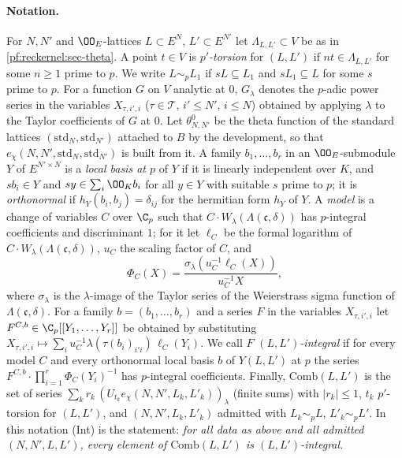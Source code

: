 \paragraph{Notation.} For $N,N'$ and $\OO_E$-lattices $L\subset E^N$, $L'\subset E^{N'}$ let $\Lambda_{L,L'}\subset V$ be as in
\cref{pf:reckernel:sec-theta}. A point $t\in V$ is \emph{$p'$-torsion} for $(L,L')$ if $nt\in\Lambda_{L,L'}$ for some
$n\ge1$ prime to $p$. We write $L\sim_pL_1$ if $sL\subseteq L_1$ and $sL_1\subseteq L$ for some $s$ prime to $p$. For a
function $G$ on $V$ analytic at $0$, $G_\lambda$ denotes the $p$-adic power series in the variables $X_{\tau,i',i}$
($\tau\in\mathcal T$, $i'\le N'$, $i\le N$) obtained by applying $\lambda$ to the Taylor coefficients of $G$ at $0$. Let
$\theta^0_{N,N'}$ be the theta function of the standard lattices $(\mathrm{std}_N,\mathrm{std}_{N'})$ attached to $B$ by the
development, so that $e_\chi(N,N',\mathrm{std}_N,\mathrm{std}_{N'})$ is built from it. A family $b_1,\dots,b_r$ in an
$\OO_E$-submodule $Y$ of $E^{N'\times N}$ is a \emph{local basis at $p$} of $Y$ if it is linearly independent over $K$, and
$sb_i\in Y$ and $sy\in\sum_i\OO_Kb_i$ for all $y\in Y$ with suitable $s$ prime to $p$; it is \emph{orthonormal} if
$h_Y(b_i,b_j)=\delta_{ij}$ for the hermitian form $h_Y$ of $Y$. A \emph{model} is a change of variables $C$ over $\C_p$ such
that $C\cdot W_\lambda(\Lambda(\mathfrak c,\delta))$ has $p$-integral coefficients and discriminant $1$; for it let $\ell_C$
be the formal logarithm of $C\cdot W_\lambda(\Lambda(\mathfrak c,\delta))$, $u_C$ the scaling factor of $C$, and
\[
\Phi_C(X)=\frac{\sigma_\lambda(u_C^{-1}\ell_C(X))}{u_C^{-1}X},
\]
where $\sigma_\lambda$ is the $\lambda$-image of the Taylor series of the Weierstrass sigma function of
$\Lambda(\mathfrak c,\delta)$. For a family $b=(b_1,\dots,b_r)$ and a series $F$ in the variables $X_{\tau,i',i}$ let
$F^{C,b}\in\C_p[[Y_1,\dots,Y_r]]$ be obtained by substituting
$X_{\tau,i',i}\mapsto\sum_iu_C^{-1}\lambda(\tau(b_i)_{i'i})\,\ell_C(Y_i)$. We call $F$ \emph{$(L,L')$-integral} if for every
model $C$ and every orthonormal local basis $b$ of $Y(L,L')$ at $p$ the series
$F^{C,b}\cdot\prod_{i=1}^r\Phi_C(Y_i)^{-1}$ has $p$-integral coefficients. Finally, $\mathrm{Comb}(L,L')$ is the set of
series $\sum_kr_k\,(U_{t_k}e_\chi(N,N',L_k,L'_k))_\lambda$ (finite sums) with $|r_k|\le1$, $t_k$ $p'$-torsion for
$(L,L')$, and $(N,N',L_k,L'_k)$ admitted with $L_k\sim_pL$, $L'_k\sim_pL'$. In this notation \textup{(Int)} is the
statement: \emph{for all data as above and all admitted $(N,N',L,L')$, every element of $\mathrm{Comb}(L,L')$ is
$(L,L')$-integral.}


